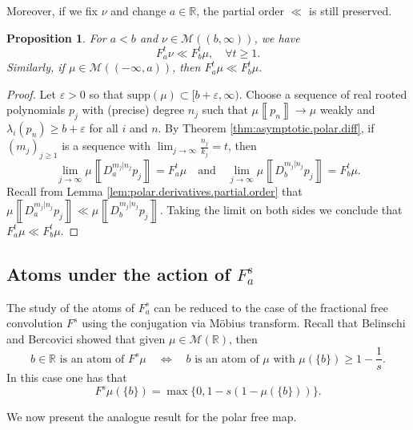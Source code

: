 \documentclass[reqno,11pt]{amsart}
\newtheorem{proposition}[theorem]{Proposition}
\theoremstyle{remark}
\newcommand{\rr}{\mathbb{R}}
\newcommand{\MM}{\mathcal{M}}
\newcommand{\polars}[3]{D_{#1}^{#2|#3}}
\newcommand{\freepower}[1]{F^{#1}}
\newcommand{\pfreepower}[2]{F_{#1}^{#2}}
\newcommand{\meas}[1]{\mu \left\llbracket #1 \right\rrbracket}
\begin{document}
Moreover, if we fix $\nu$ and change $a\in \rr$, the partial order $\ll$ is still preserved.
\begin{proposition}
    For $a<b$ and $ \nu\in \MM((b,\infty)) $, we have
    $$ \pfreepower{a}{t}\nu \ll \pfreepower{b}{t}\mu,\quad \forall t\geq 1. $$
    Similarly, if $  \mu\in \MM((-\infty,a)) $, then $ \pfreepower{a}{t}\mu \ll \pfreepower{b}{t}\mu $.
\end{proposition}
\begin{proof}
Let $\varepsilon>0$ so that $ \text{supp}(\mu)\subset [b+\varepsilon,\infty) $. Choose a sequence of real rooted polynomials $ p_j $ with (precise) degree $ n_j$ such that $ \meas{p_n} \to \mu $ weakly and $ \lambda_{i}(p_n)\geq b+\varepsilon $ for all $i$ and $n$. By Theorem \ref{thm:asymptotic.polar.diff}, if $ (m_j)_{j\geq 1} $ is a sequence with $\lim_{j\to \infty} \tfrac{n_j}{k_j}=t$, then $$ \lim_{j\to\infty} \meas{\polars{a}{m_j}{n_j} p_j}=  \pfreepower{a}{t}\mu \quad \text{and} \quad  \lim_{j\to\infty} \meas{\polars{b}{m_j}{n_j} p_j}=  \pfreepower{b}{t}\mu .$$ 
Recall from Lemma \ref{lem:polar.derivatives.partial.order}  that $ \meas{\polars{a}{m_j}{n_j} p_j}\ll \meas{\polars{b}{m_j}{n_j} p_j} $. Taking the limit on both sides we conclude that $ \pfreepower{a}{t}\mu \ll \pfreepower{b}{t} \mu$.
\end{proof}


\subsection{Atoms under the action of \texorpdfstring{$\pfreepower{a}{s}$}{Fsa} }

The study of the atoms of $\pfreepower{a}{s}$ can be reduced to the case of the fractional free convolution $\freepower{s}$ using the conjugation via Möbius transform. Recall that Belinschi and Bercovici \cite[Theorem 3.1]{belinschi2004atoms} showed that given $\mu\in \MM(\rr)$, 
then 
\begin{equation}
\label{eq:BB04.atoms}
 b\in \rr\text{ is an atom of }\freepower{s}\mu \quad \Leftrightarrow \quad b \text{ is an atom of $\mu$ with }\mu(\{b\})\geq 1-\frac{1}{s}.   
\end{equation}
 In this case one has that 
$$ \freepower{s}\mu(\{b\}) = \max\{0,1-s(1-\mu(\{b\}))\} .$$

We now present the analogue result for the polar free map.
\end{document}
